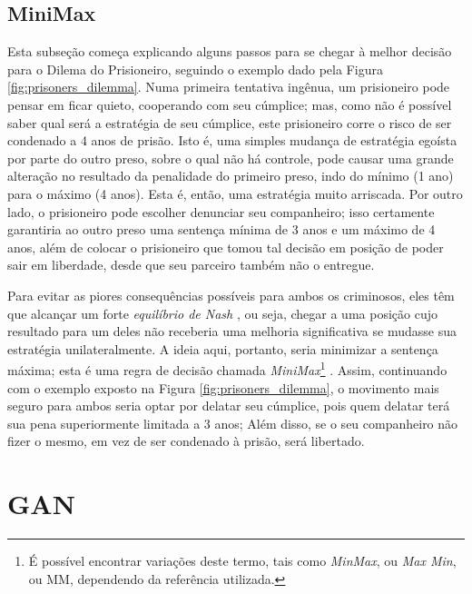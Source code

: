 \subsection{MiniMax}
\label{subsec:gan_minmax}

Esta subseção começa explicando alguns passos para se chegar à melhor decisão para o Dilema do Prisioneiro, seguindo o exemplo dado pela Figura \ref{fig:prisoners_dilemma}. Numa primeira tentativa ingênua, um prisioneiro pode pensar em ficar quieto, cooperando com seu cúmplice; mas, como não é possível saber qual será a estratégia de seu cúmplice, este prisioneiro corre o risco de ser condenado a 4 anos de prisão. Isto é, uma simples mudança de estratégia egoísta por parte do outro preso, sobre o qual não há controle, pode causar uma grande alteração no resultado da penalidade do primeiro preso, indo do mínimo (1 ano) para o máximo (4 anos). Esta é, então, uma estratégia muito arriscada. Por outro lado, o prisioneiro pode escolher denunciar seu companheiro; isso certamente garantiria ao outro preso uma sentença mínima de 3 anos e um máximo de 4 anos, além de colocar o prisioneiro que tomou tal decisão em posição de poder sair em liberdade, desde que seu parceiro também não o entregue.

Para evitar as piores consequências possíveis para ambos os criminosos, eles têm que alcançar um forte \textit{equilíbrio de Nash} \citep{Nash48}, ou seja, chegar a uma posição cujo resultado para um deles não receberia uma melhoria significativa se mudasse sua estratégia unilateralmente. A ideia aqui, portanto, seria minimizar a sentença máxima; esta é uma regra de decisão chamada \textit{MiniMax}\footnote{É possível encontrar variações deste termo, tais como \textit{MinMax}, ou \textit{Max Min}, ou MM, dependendo da referência utilizada.} \citep{v.Neumann1928, blackwell1956analog, willem1997minimax}. Assim, continuando com o exemplo exposto na Figura \ref{fig:prisoners_dilemma}, o movimento mais seguro para ambos seria optar por delatar seu cúmplice, pois quem delatar terá sua pena superiormente limitada a 3 anos; Além disso, se o seu companheiro não fizer o mesmo, em vez de ser condenado à prisão, será libertado.



\section{GAN}
\label{sec:gan_gan}

